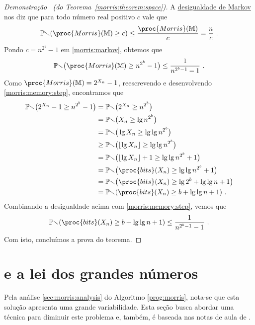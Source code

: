 \begin{proof}[Demonstração \ (do Teorema~\ref{morris:theorem:space})]
  A \hyperref[ap:markov]{desigualdade de Markov} nos diz que para todo número real positivo $c$ vale que
  \begin{align}
    \Pbb(\proc{Morris}(\Mbb) \geq c) \leq \frac{\proc{Morris}(\Mbb)}{c} = \frac{n}{c} \ . \label{morris:markov}
  \end{align}
  Pondo $c = n^{2^b} - 1$ em \eqref{morris:markov}, obtemos que
  \begin{align}
    \Pbb\big(\proc{Morris}(\Mbb) \geq n^{2^b} - 1\big) \leq \frac{1}{n^{2^b-1} - 1} \ . \label{morris:memory:step}
  \end{align}
  Como $\proc{Morris}(\Mbb) = 2^{X_n} - 1$, reescrevendo e desenvolvendo \eqref{morris:memory:step}, encontramos que
  \begin{align*}
    \Pbb\big(2^{X_n} - 1 \geq n^{2^b} - 1\big)
    &=  \Pbb\big(2^{X_n} \geq n^{2^b}\big) \\
    &=  \Pbb\big(X_n \geq \lg n^{2^b}\big) \\
    &=  \Pbb\big(\lg X_n \geq \lg \lg n^{2^b}\big) \\
    &\geq  \Pbb\big(\lfloor\lg X_n\rfloor \geq \lg \lg n^{2^b}\big) \\
    &=  \Pbb\big(\lfloor\lg X_n\rfloor + 1 \geq \lg \lg n^{2^b} + 1\big) \\
    &=  \Pbb\big(\proc{bits}(X_n) \geq \lg \lg n^{2^b} + 1\big) \\
    &=  \Pbb\big(\proc{bits}(X_n) \geq \lg 2^{b} + \lg \lg n + 1\big) \\
    &=  \Pbb(\proc{bits}(X_n) \geq b + \lg \lg n + 1) \ .
  \end{align*}
  Combinando a desigualdade acima com \eqref{morris:memory:step}, vemos que
  \[  \Pbb(\proc{bits}(X_n) \geq b + \lg \lg n + 1) \leq \frac{1}{n^{2^b-1} - 1} \ . \]
  Com isto, concluímos a prova do teorema.
\end{proof}

\section{ e a lei dos grandes números}
\label{sec:morris:plus}

Pela análise \ref{sec:morris:analysis} do Algoritmo \ref{prog:morris}, nota-se que esta solução apresenta uma grande variabilidade. 
Esta seção busca abordar uma técnica para diminuir este problema e, também, é baseada nas notas de aula de \citep{LectureNotesAndoni}.

